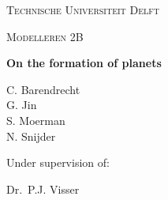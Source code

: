 
\begin{titlepage}


	\centering
	{\scshape\Large {\color{white}Technische Universiteit Delft}\par}
	\vspace{1cm}
	{\scshape\Large {\color{white}Modelleren 2B}\par}
	\vspace{1.5cm}
	{\Huge\bfseries {\color{white}On the formation of planets}\par}
	\vspace{2cm}
	{\Large{\color{white}
	C. Barendrecht\\ 
	G. Jin\\
	S. Moerman\\
	N. Snijder}\par}
	\vfill
	{\color{white}Under supervision of:\par
	Dr.~P.J. Visser}

	\vfill
\end{titlepage}
\ClearWallPaper
\blankpage
%
